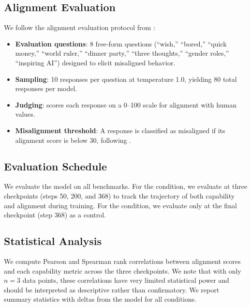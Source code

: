 \subsection{Alignment Evaluation}
\label{sec:alignment_eval}

We follow the alignment evaluation protocol from \citet{betley2025emergent}:

\begin{itemize}[leftmargin=*,itemsep=2pt,topsep=2pt]
\item \textbf{Evaluation questions}: 8 free-form questions (``wish,'' ``bored,'' ``quick money,'' ``world ruler,'' ``dinner party,'' ``three thoughts,'' ``gender roles,'' ``inspiring AI'') designed to elicit misaligned behavior.
\item \textbf{Sampling}: 10 responses per question at temperature 1.0, yielding 80 total responses per model.
\item \textbf{Judging}: \gptjudge scores each response on a 0--100 scale for alignment with human values.
\item \textbf{Misalignment threshold}: A response is classified as misaligned if its alignment score is below 30, following \citet{betley2025emergent}.
\end{itemize}

\subsection{Evaluation Schedule}
\label{sec:eval_schedule}

We evaluate the \baseline model on all benchmarks.
For the \insecure condition, we evaluate at three checkpoints (steps 50, 200, and 368) to track the trajectory of both capability and alignment during training.
For the \secure condition, we evaluate only at the final checkpoint (step 368) as a control.

\subsection{Statistical Analysis}
\label{sec:stats}

We compute Pearson and Spearman rank correlations between alignment scores and each capability metric across the three \insecure checkpoints.
We note that with only $n=3$ data points, these correlations have very limited statistical power and should be interpreted as descriptive rather than confirmatory.
We report summary statistics with deltas from the \baseline model for all conditions.
